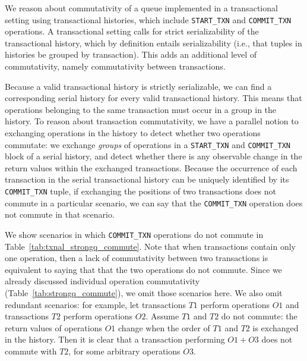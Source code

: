 We reason about commutativity of a queue implemented in a transactional setting using transactional histories, which include \texttt{START\_TXN} and \texttt{COMMIT\_TXN} operations. A transactional setting calls for strict serializability of the transactional history, which by definition entails serializability (i.e., that tuples in histories be grouped by transaction). This adds an additional level of commutativity, namely commutativity between transactions.

Because a valid transactional history is strictly serializable, we can find a corresponding serial history for every valid transactional history. This means that operations belonging to the same transaction must occur in a group in the history. To reason about transaction commutativity, we have a parallel notion to exchanging operations in the history to detect whether two operations commutate:  we exchange \emph{groups} of operations in a \texttt{START\_TXN} and \texttt{COMMIT\_TXN} block of a serial history, and detect whether there is any observable change in the return values within the exchanged transactions. Because the occurrence of each transaction in the serial transactional history can be uniquely identified by its \texttt{COMMIT\_TXN} tuple, if exchanging the positions of two transactions does not commute in a particular scenario, we can say that the \texttt{COMMIT\_TXN} operation does not commute in that scenario.

We show scenarios in which \texttt{COMMIT\_TXN} operations do not commute in Table~\ref{tab:txnal_strongq_commute}. Note that when transactions contain only one operation, then a lack of commutativity between two transactions is equivalent to saying that that the two operations do not commute. Since we already discussed individual operation commutativity (Table~\ref{tab:strongq_commute}), we omit those scenarios here. We also omit redundant scenarios: for example, let transactions $T1$ perform operations $O1$ and transactions $T2$ perform operations $O2$. Assume $T1$ and $T2$ do not commute: the return values of operations $O1$ change when the order of $T1$ and $T2$ is exchanged in the history. Then it is clear that a transaction performing $O1 + O3$ does not commute with $T2$, for some arbitrary operations $O3$.

